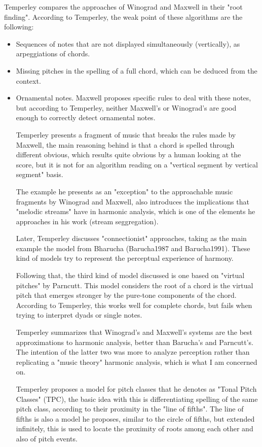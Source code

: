   Temperley compares the approaches of Winograd and Maxwell in their "root finding". According to Temperley, the weak point of these algorithms are the following:

  \begin{itemize}
    \item Sequences of notes that are not displayed simultaneously (vertically), as arpeggiations of chords.
    \item Missing pitches in the spelling of a full chord, which can be deduced from the context.
    \item Ornamental notes. Maxwell proposes specific rules to deal with these notes, but according to Temperley, neither Maxwell’s or Winograd’s are good enough to correctly detect ornamental notes.

    Temperley presents a fragment of music that breaks the rules made by Maxwell, the main reasoning behind is that a chord is spelled through different obvious, which results quite obvious by a human looking at the score, but it is not for an algorithm reading on a "vertical segment by vertical segment" basis.

    The example he presents as an "exception" to the approachable music fragments by Winograd and Maxwell, also introduces the implications that "melodic streams" have in harmonic analysis, which is one of the elements he approaches in his work (stream seggregation).

    Later, Temperley discusses "connectionist" approaches, taking as the main example the model from Bharucha (Barucha1987 and Barucha1991). These kind of models try to represent the perceptual experience of harmony.

    Following that, the third kind of model discussed is one based on "virtual pitches" by Parncutt. This model considers the root of a chord is the virtual pitch that emerges stronger by the pure-tone components of the chord. According to Temperley, this works well for complete chords, but fails when trying to interpret dyads or single notes.

    Temperley summarizes that Winograd's and Maxwell's systems are the best approximations to harmonic analysis, better than Barucha's and Parncutt's. The intention of the latter two was more to analyze perception rather than replicating a "music theory" harmonic analysis, which is what I am concerned on.

    Temperley proposes a model for pitch classes that he denotes as "Tonal Pitch Classes" (TPC), the basic idea with this is differentiating spelling of the same pitch class, according to their proximity in the "line of fifths". The line of fifths is also a model he proposes, similar to the circle of fifths, but extended infinitely, this is used to locate the proximity of roots among each other and also of pitch events.


\end{itemize}

